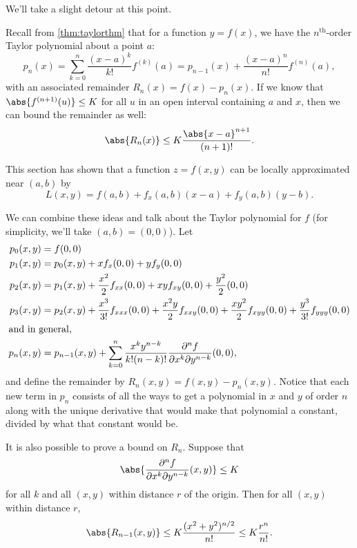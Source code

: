 We'll take a slight detour at this point.

Recall from \ref{thm:taylorthm} that for a function $y=f(x)$, we have the $n^{\text{th}}$-order Taylor polynomial about a point $a$:
\[
 p_n(x)
 =\sum_{k=0}^n\frac{(x-a)^k}{k!}f^{(k)}(a)
 =p_{n-1}(x)+\frac{(x-a)^n}{n!}f^{(n)}(a),
\]
with an associated remainder $R_n(x)=f(x)-p_n(x)$.  If we know that $\abs{f^{(n+1)}(u)}\le K$ for all $u$ in an open interval containing $a$ and $x$, then we can bound the remainder as well:
\[\abs{R_n(x)}\le K\frac{\abs{x-a}^{n+1}}{(n+1)!}.\]

This section has shown that a function $z=f(x,y)$ can be locally approximated near $(a,b)$ by
\[ L(x,y)=f(a,b)+f_x(a,b)(x-a)+f_y(a,b)(y-b). \]

We can combine these ideas and talk about the Taylor polynomial for $f$ (for simplicity, we'll take $(a,b)=(0,0)$). Let
\begin{align*}\index{Taylor Series!multivariable}
 p_0(x,y)&=f(0,0) \\
 p_1(x,y)&=p_0(x,y)+xf_x(0,0)+yf_y(0,0) \\
 p_2(x,y)&=p_1(x,y)+\frac{x^2}2f_{xx}(0,0)+xyf_{xy}(0,0)+\frac{y^2}2(0,0) \\
 p_3(x,y)&=p_2(x,y)+\frac{x^3}{3!}f_{xxx}(0,0)+\frac{x^2y}2f_{xxy}(0,0)
 +\frac{xy^2}2f_{xyy}(0,0)+\frac{y^3}{3!}f_{yyy}(0,0) \\
 \intertext{and in general,}
 p_n(x,y)&=p_{n-1}(x,y)+\sum_{k=0}^n\frac{x^k y^{n-k}}{k!(n-k)!}
 \frac{\partial^n f}{\partial x^k\partial y^{n-k}}(0,0),
\end{align*}
and define the remainder by $R_n(x,y)=f(x,y)-p_n(x,y)$. Notice that each new term in $p_n$ consists of all the ways to get a polynomial in $x$ and $y$ of order $n$ along with the unique derivative that would make that polynomial a constant, divided by what that constant would be.

It is also possible to prove a bound on $R_n$.  Suppose that
\[\abs{\frac{\partial^n f}{\partial x^k\partial y^{n-k}}(x,y)}\le K\]
for all $k$ and all $(x,y)$ within distance $r$ of the origin. Then for all $(x,y)$ within distance $r$,
\[
 \abs{R_{n-1}(x,y)}
 \le K\frac{(x^2+y^2)^{n/2}}{n!}
 \le K\frac{r^n}{n!}.
\]

\iffalse %

